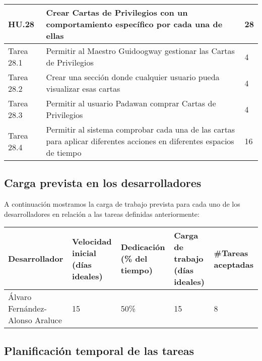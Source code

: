 \begin{table}[h]
	\centering
	\begin{tabular}{| p{2.3cm} | p{6.7cm} | p{2cm} |}
		\rowcolor[HTML]{329A9D} 
		{\color[HTML]{FFFFFF} \textbf{HU.28}} & {\color[HTML]{FFFFFF} \textbf{Crear Cartas de Privilegios con un comportamiento específico por cada una de ellas}} & {\color[HTML]{FFFFFF} \textbf{28}}  \\ \hline
		Tarea 28.1 & Permitir al Maestro Guidoogway gestionar las Cartas de Privilegios & 4 \\ \hline
		Tarea 28.2 & Crear una sección donde cualquier usuario pueda visualizar esas cartas & 4 \\ \hline
		Tarea 28.3 & Permitir al usuario Padawan comprar Cartas de Privilegios & 4 \\ \hline
		Tarea 28.4 & Permitir al sistema comprobar cada una de las cartas para aplicar diferentes acciones en diferentes espacios de tiempo & 16 \\ \hline
	\end{tabular}
\end{table}

\newpage

\subsection{Carga prevista en los desarrolladores}

A continuación mostramos la carga de trabajo prevista para cada uno de los desarrolladores en relación a las tareas definidas anteriormente:

\begin{table}[h]
	\centering
	\begin{tabular}{| p{3cm} | p{2cm} | p{2cm} | p{2cm} | p{2cm} |}
		\rowcolor[HTML]{329A9D} 
		{\color[HTML]{FFFFFF} \textbf{Desarrollador}} & {\color[HTML]{FFFFFF} \textbf{Velocidad inicial (días ideales)}} & {\color[HTML]{FFFFFF} \textbf{Dedicación (\% del tiempo)}} & {\color[HTML]{FFFFFF} \textbf{Carga de trabajo (días ideales)}} & {\color[HTML]{FFFFFF} \textbf{\#Tareas aceptadas}}  \\ \hline
		Álvaro Fernández-Alonso Araluce & 15 & 50\% & 15 & 8 \\ \hline
	\end{tabular}
\end{table}


\subsection{Planificación temporal de las tareas}

